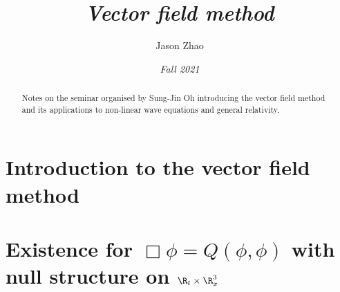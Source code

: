 \documentclass[10pt, reqno]{amsart}
\title
{
	\emph{Vector field method}
}
\author{Jason Zhao}
\date{\emph{Fall 2021}}
\theoremstyle{definition}
\theoremstyle{remark}
\begin{document}
\maketitle

\begin{abstract}
	Notes on the seminar organised by Sung-Jin Oh introducing the vector field method and its applications to non-linear wave equations and general relativity. 
\end{abstract}

\tableofcontents

\section{Introduction to the vector field method}


\section{Existence for $\Box \phi = Q(\phi, \phi)$ with null structure on $\R_t \times \R^3_x$}




 
\end{document}
